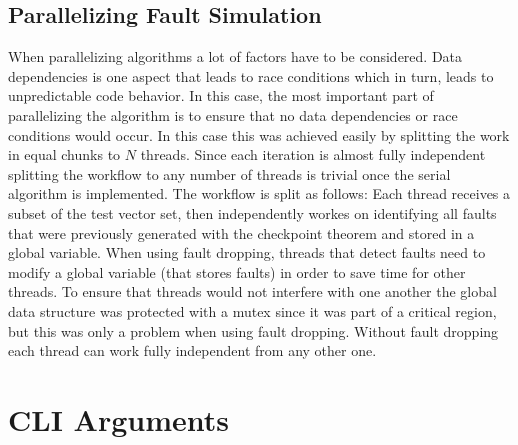 \documentclass[a4paper,12pt]{article}
\begin{document}
\subsection*{Parallelizing Fault Simulation}
When parallelizing algorithms a lot of factors have to be considered. Data dependencies is one aspect that leads to race conditions which in turn, leads to unpredictable code behavior. In this case, the most important part of parallelizing the algorithm is to ensure that no data dependencies or race conditions would occur. In this case this was achieved easily by splitting the work in equal chunks to $N$ threads. Since each iteration is almost fully independent splitting the workflow to any number of threads is trivial once the serial algorithm is implemented. The workflow is split as follows: Each thread receives a subset of the test vector set, then independently workes on identifying all faults that were previously generated with the checkpoint theorem and stored in a global variable. When using fault dropping, threads that detect faults need to modify a global variable (that stores faults) in order to save time for other threads. To ensure that threads would not interfere with one another the global data structure was protected with a mutex since it was part of a critical region, but this was only a problem when using fault dropping. Without fault dropping each thread can work fully independent from any other one.

\clearpage


\section*{CLI Arguments}
\end{document}
